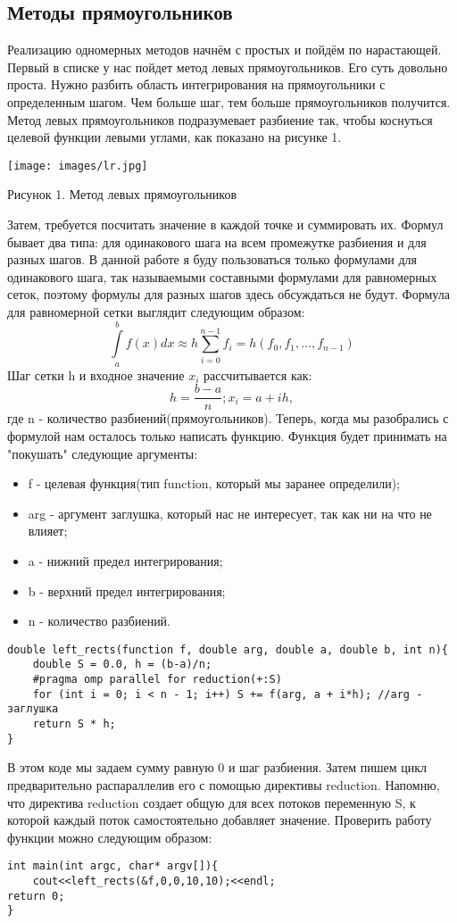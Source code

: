 \documentclass{article}
\begin{document}
\subsection{Методы прямоугольников}
Реализацию одномерных методов начнём с простых и пойдём по нарастающей. Первый в списке у нас пойдет метод левых прямоугольников. Его суть довольно проста. Нужно
разбить область интегрирования на прямоугольники с определенным шагом. Чем больше шаг, тем больше прямоугольников получится. Метод левых прямоугольников подразумевает разбиение так, чтобы коснуться целевой функции левыми углами, как показано на рисунке 1.
\begin{center}
\texttt{[image: images/lr.jpg]}

Рисунок 1. Метод левых прямоугольников
\end{center}
Затем, требуется посчитать значение в каждой точке и суммировать их. Формул бывает два типа: для одинакового шага на всем промежутке разбиения и для разных шагов. В данной работе я буду пользоваться только формулами для одинакового шага, так называемыми составными формулами для равномерных сеток, поэтому формулы для разных шагов здесь обсуждаться не будут. Формула для равномерной сетки выглядит следующим образом:
$$\int\limits_a^b f(x)dx \approx h\sum_{i=0}^{n-1}f_i = h(f_0,f_1,...,f_{n-1})$$
Шаг сетки h и входное значение $x_i$ рассчитывается как:
$$h = \frac{b-a}{n}; x_i = a+ih,$$
где n - количество разбиений(прямоугольников).
Теперь, когда мы разобрались с формулой нам осталось только написать функцию.
Функция будет принимать на "покушать" следующие аргументы:
\begin{itemize}
    \item f - целевая функция(тип function, который мы заранее определили);
    \item arg - аргумент заглушка, который нас не интересует, так как ни на что не влияет;
    \item a - нижний предел интегрирования;
    \item b - верхний предел интегрирования;
    \item n - количество разбиений.
\end{itemize}
\begin{lstlisting}
double left_rects(function f, double arg, double a, double b, int n){
    double S = 0.0, h = (b-a)/n;
    #pragma omp parallel for reduction(+:S)
    for (int i = 0; i < n - 1; i++) S += f(arg, a + i*h); //arg - заглушка
    return S * h;
}
\end{lstlisting}
В этом коде мы задаем сумму равную 0 и шаг разбиения. Затем пишем цикл предварительно распараллелив его с помощью директивы reduction. Напомню, что директива reduction создает общую для всех потоков переменную S, к которой каждый поток самостоятельно добавляет значение.
Проверить работу функции можно следующим образом:
\begin{lstlisting}
int main(int argc, char* argv[]){
    cout<<left_rects(&f,0,0,10,10);<<endl;
return 0;
}
\end{lstlisting}
\end{document}
